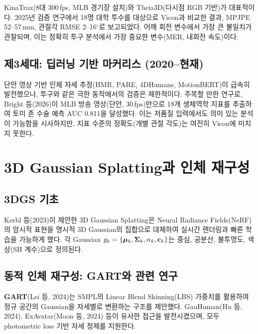 \documentclass[11pt, a4paper]{report}
\begin{document}
KinaTrax(8대 300\,fps, MLB 경기장 설치)와 Theia3D(다시점 RGB 기반)가 대표적이다.
2025년 검증 연구에서 18명 대학 투수를 대상으로 Vicon과 비교한 결과,
MPJPE 52--57\,mm, 관절각 RMSE 2--16$^\circ$로 보고되었다.
어깨 회전 변수에서 가장 큰 불일치가 관찰되며,
이는 정확히 투구 분석에서 가장 중요한 변수(MER, 내회전 속도)이다.

\subsection{제3세대: 딥러닝 기반 마커리스 (2020--현재)}

단안 영상 기반 인체 자세 추정(HMR, PARE, 4DHumans, MotionBERT)이 급속히 발전했으나,
투구와 같은 극한 동작에서의 검증은 제한적이다.
주목할 만한 연구로, Bright 등(2026)이 MLB 방송 영상(단안, 30\,fps)만으로
18개 생체역학 지표를 추출하여 토미 존 수술 예측 AUC 0.811을 달성했다.
이는 저품질 입력에서도 의미 있는 분석이 가능함을 시사하지만,
지표 수준의 정확도(개별 관절 각도)는 여전히 Vicon에 미치지 못한다.


\section{3D Gaussian Splatting과 인체 재구성}

\subsection{3DGS 기초}

Kerbl 등(2023)이 제안한 3D Gaussian Splatting은 Neural Radiance Fields(NeRF)의 암시적 표현을
명시적 3D Gaussian의 집합으로 대체하여 실시간 렌더링과 빠른 학습을 가능하게 했다.
각 Gaussian $g_k = \{\bm{\mu}_k, \bm{\Sigma}_k, \alpha_k, \mathbf{c}_k\}$는 중심, 공분산, 불투명도, 색상(SH 계수)으로 정의된다.

\subsection{동적 인체 재구성: GART와 관련 연구}

\textbf{GART}(Lei 등, 2024)는 SMPL의 Linear Blend Skinning(LBS) 가중치를 활용하여
정규 공간의 Gaussian을 자세별로 변환하는 구조를 제안했다.
GauHuman(Hu 등, 2024), ExAvatar(Moon 등, 2024) 등이 유사한 접근을 발전시켰으며,
모두 photometric loss 기반 자세 정제를 지원한다.
\end{document}
